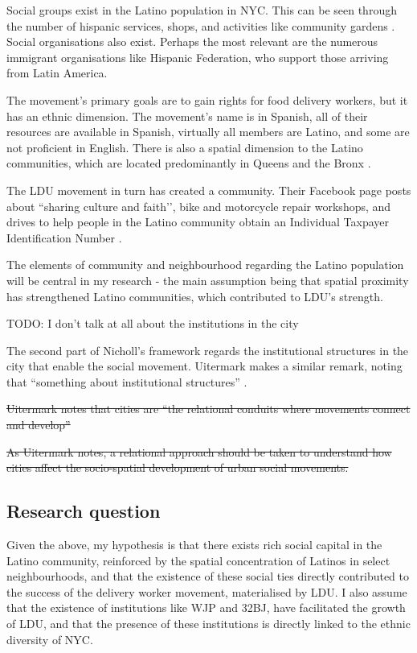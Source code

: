 \documentclass{article}[12pt]
\begin{document}
Social groups exist in the Latino population in NYC. This can be seen through the number of hispanic services, shops, and activities like community gardens \parencite{saldivar2004culturing}. Social organisations also exist. Perhaps the most relevant are the numerous immigrant organisations like Hispanic Federation, who support those arriving from Latin America. 

The movement’s primary goals are to gain rights for food delivery workers, but it has an ethnic dimension. The movement’s name is in Spanish, all of their resources are available in Spanish, virtually all members are Latino, and some are not proficient in English. There is also a spatial dimension to the Latino communities, which are located predominantly in Queens and the Bronx \parencite{nycimmigrantpopulation2021}. 

The LDU movement in turn has created a community. Their Facebook page posts about ``sharing culture and faith’’, bike and motorcycle repair workshops, and drives to help people in the Latino community obtain an Individual Taxpayer Identification Number \parencite{facebookldu}.

The elements of community and neighbourhood regarding the Latino population will be central in my research - the main assumption being that spatial proximity has strengthened Latino communities, which contributed to LDU’s strength.

TODO: I don't talk at all about the institutions in the city

The second part of Nicholl's framework regards the institutional structures in the city that enable the social movement. Uitermark makes a similar remark, noting that ``something about institutional structures'' \parencite{uitermark2012cities}.

\sout{Uitermark notes that cities are ``the relational conduits where movements connect and develop''} %

\sout{As Uitermark notes, a relational approach should be taken to understand how cities affect the socio-spatial development of urban social movements.} %

\subsection{Research question}

Given the above, my hypothesis is that there exists rich social capital in the Latino community, reinforced by the spatial concentration of Latinos in select neighbourhoods, and that the existence of these social ties directly contributed to the success of the delivery worker movement, materialised by LDU. 
I also assume that the existence of institutions like WJP and 32BJ, have facilitated the growth of LDU, and that the presence of these institutions is directly linked to the ethnic diversity of NYC.
\end{document}
